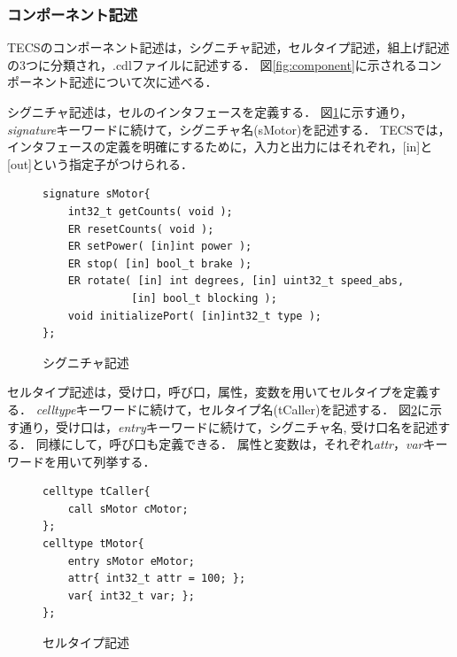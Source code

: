 \documentclass[submit,techrep]{ipsj}
\begin{document}
\subsubsection{コンポーネント記述}
TECSのコンポーネント記述は，シグニチャ記述，セルタイプ記述，組上げ記述の3つに分類され，.cdlファイルに記述する．
図\ref{fig:component}に示されるコンポーネント記述について次に述べる．

        シグニチャ記述は，セルのインタフェースを定義する．
        図\ref{signature}に示す通り，{\it signature}キーワードに続けて，シグニチャ名(sMotor)を記述する．
        TECSでは，インタフェースの定義を明確にするために，入力と出力にはそれぞれ，[in]と[out]という指定子がつけられる．
        
\begin{figure}[t]
\centering
\begin{lstlisting}
signature sMotor{
    int32_t getCounts( void );
    ER resetCounts( void );
    ER setPower( [in]int power );
    ER stop( [in] bool_t brake );
    ER rotate( [in] int degrees, [in] uint32_t speed_abs,
              [in] bool_t blocking );
    void initializePort( [in]int32_t type );
};
\end{lstlisting}
\caption{シグニチャ記述}
\vspace{-2mm}
\label{signature}
\end{figure}

        セルタイプ記述は，受け口，呼び口，属性，変数を用いてセルタイプを定義する．
        {\it celltype}キーワードに続けて，セルタイプ名(tCaller)を記述する．
        図\ref{celltype}に示す通り，受け口は，{\it entry}キーワードに続けて，シグニチャ名, 受け口名を記述する．
        同様にして，呼び口も定義できる．
        属性と変数は，それぞれ{\it attr}，{\it var}キーワードを用いて列挙する．

\begin{figure}[t]
\centering
\begin{lstlisting}
celltype tCaller{
    call sMotor cMotor;
};
celltype tMotor{
    entry sMotor eMotor;
    attr{ int32_t attr = 100; };
    var{ int32_t var; };
};
\end{lstlisting}
\caption{セルタイプ記述}  
\vspace{-2mm}
\label{celltype}
\end{figure}
\end{document}

